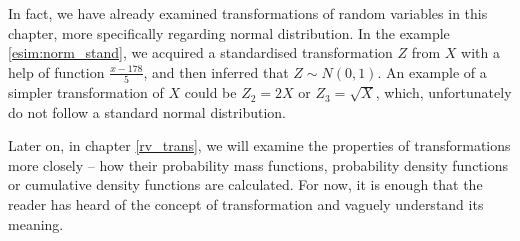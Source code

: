 \documentclass[12pt,a4paper,leqno]{report}
\theoremstyle{plain}
\theoremstyle{definition}
\begin{document}
In fact, we have already examined transformations of random variables in this chapter, more specifically regarding normal distribution. In the example \ref{esim:norm_stand}, we acquired a standardised transformation $Z$ from $X$ with a help of function $\frac{x-178}{5}$, and then inferred that $Z \sim N(0,1)$. An example of a simpler transformation of $X$ could be $Z_2 = 2X$ or $Z_3 = \sqrt{X}$, which, unfortunately do not follow a standard normal distribution. 

Later on, in chapter \ref{rv_trans}, we will examine the properties of transformations more closely -- how their probability mass functions, probability density functions or cumulative density functions are calculated. For now, it is enough that the reader has heard of the concept of transformation and vaguely understand its meaning.
\end{document}
